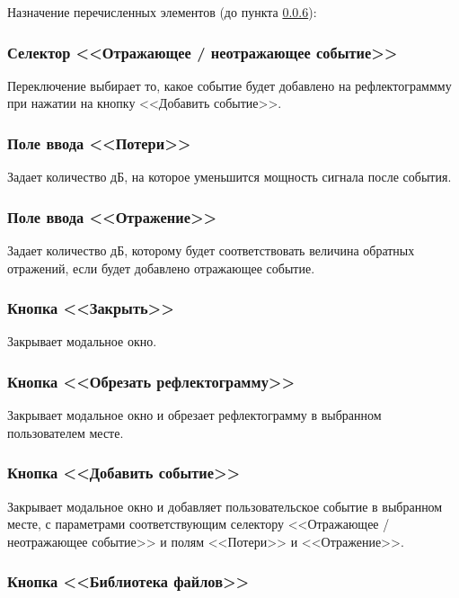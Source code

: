 Назначение перечисленных элементов (до пункта \ref{добавить_событие}):

\subsubsection{Селектор  <<Отражающее / неотражающее событие>>}

Переключение выбирает то, какое событие будет добавлено на рефлектограммму при нажатии на кнопку <<Добавить событие>>.

\subsubsection{Поле ввода <<Потери>>}

Задает количество дБ, на которое уменьшится мощность сигнала после события.

\subsubsection{Поле ввода <<Отражение>>}

Задает количество дБ, которому будет соответствовать величина обратных отражений, если будет добавлено отражающее событие.

\subsubsection{Кнопка <<Закрыть>>}

Закрывает \gls{модальное окно}.

\subsubsection{Кнопка <<Обрезать рефлектограмму>>}
\label{обрезать_рефлектограмму}

Закрывает \gls{модальное окно} и обрезает рефлектограмму в выбранном пользователем месте.

\subsubsection{Кнопка <<Добавить событие>>}
\label{добавить_событие}

Закрывает \gls{модальное окно} и добавляет пользовательское событие в выбранном месте, с параметрами соответствующим селектору <<Отражающее / неотражающее событие>> и полям <<Потери>> и <<Отражение>>.

\subsubsection{Кнопка <<Библиотека файлов>>}

